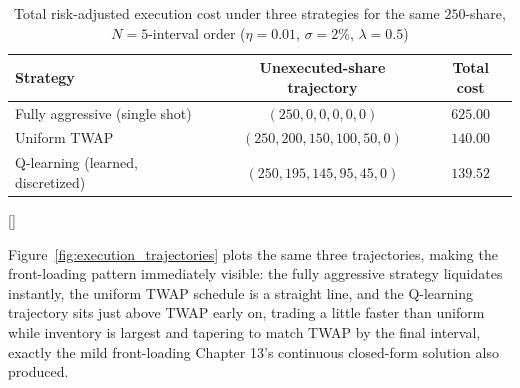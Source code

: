 \documentclass[../ai_in_finance]{subfiles}
\begin{document}
\begin{table}[htbp]
\centering
\begin{lrbox}{\bookmeasuredbox}
\begin{tabular}{lcc}
\toprule
Strategy & Unexecuted-share trajectory & Total cost \\
\midrule
Fully aggressive (single shot) & $(250, 0, 0, 0, 0, 0)$ & $625.00$ \\
Uniform TWAP & $(250, 200, 150, 100, 50, 0)$ & $140.00$ \\
Q-learning (learned, discretized) & $(250, 195, 145, 95, 45, 0)$ & $139.52$ \\
\bottomrule
\end{tabular}
\end{lrbox}
\ifdim\wd\bookmeasuredbox<0.65\linewidth
\setlength{\bookcapwidth}{0.65\linewidth}
\else
\setlength{\bookcapwidth}{\wd\bookmeasuredbox}
\fi
{}[\bookcapwidth]{
\usebox{\bookmeasuredbox}
}{
\caption{Total risk-adjusted execution cost under three strategies for the same $250$-share, $N=5$-interval order ($\eta=0.01$, $\sigma=2\%$, $\lambda=0.5$)}
\label{tab:rl_execution_compare}
}
\end{table}

Figure~\ref{fig:execution_trajectories} plots the same three trajectories, making the front-loading pattern immediately visible: the fully aggressive strategy liquidates instantly, the uniform TWAP schedule is a straight line, and the Q-learning trajectory sits just above TWAP early on, trading a little faster than uniform while inventory is largest and tapering to match TWAP by the final interval, exactly the mild front-loading Chapter 13's continuous closed-form solution also produced.
\end{document}
